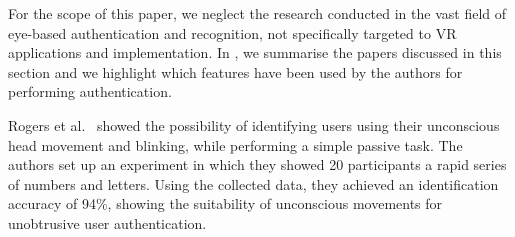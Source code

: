 \documentclass[journal]{IEEEtran}
\newcommand*\rot{\multicolumn{1}{R{40}{1.5em}}}%
\newcommand{\cmark}{\textcolor{darkgreen}{\ding{51}}}%
\begin{document}
For the scope of this paper, we neglect the research conducted in the vast field of eye-based authentication and recognition, not specifically targeted to VR applications and implementation. In , we summarise the papers discussed in this section and we highlight which features have been used by the authors for performing authentication.

\begin{table*}[t]
\centering
\normalsize
\renewcommand\arraystretch{1.5}
\caption{Authentication with eye-tracking sensors}
\label{tab:eyet}
\end{table*}


Rogers et al.~\cite{rogers2015} showed the possibility of identifying users using their unconscious head movement and blinking, while performing a simple passive task. The authors set up an experiment in which they showed 20 participants a rapid series of numbers and letters. Using the collected data, they achieved an identification accuracy of 94\%, showing the suitability of unconscious movements for unobtrusive user authentication. 
\end{document}
